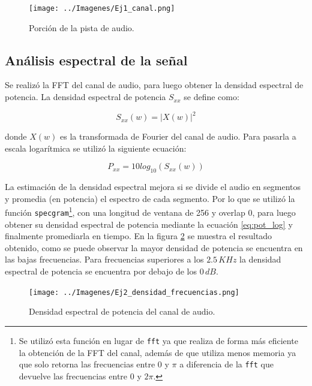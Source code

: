 \documentclass[10pt,spanish,a4paper,openany,notitlepage]{article}
\begin{document}
\begin{figure}[H] %
\begin{center}
\texttt{[image: ../Imagenes/Ej1\_canal.png]}
\caption{Porción de la pista de audio.}
 \label{fig:Ej1_audio}
\end{center}
\end{figure}

\subsection{Análisis espectral de la señal}

Se realizó la FFT del canal de audio, para luego obtener la densidad
espectral de potencia. La densidad espectral de potencia $S_{xx}$
se define como:

\begin{equation}
S_{xx}(w) = |X(w)|^2
\end{equation}

donde $X(w)$ es la transformada de Fourier del canal de audio.
Para pasarla a escala logarítmica se utilizó la siguiente ecuación:

\begin{equation}
P_{xx} = 10 log_{10}(S_{xx}(w))
\label{eq:pot_log}
\end{equation}

La estimación de la densidad espectral mejora si se divide el audio
en segmentos y promedia (en potencia) el espectro de cada segmento.
Por lo que se utilizó la función \texttt{specgram}\footnote{Se utilizó esta
función en lugar de \texttt{fft} ya que realiza de forma
más eficiente la obtención de la FFT del canal, además
de que utiliza menos memoria ya que solo retorna las frecuencias
entre 0 y $\pi$ a diferencia de la \texttt{fft} que devuelve
las frecuencias entre 0 y $2\pi$.
}, con una longitud de ventana de 256 y overlap 0, para luego obtener
su densidad espectral de potencia mediante la ecuación \ref{eq:pot_log} y finalmente
promediarla en tiempo. 
En la figura \ref{fig:Ej2_pot} se muestra el resultado obtenido, como
se puede observar la mayor densidad de potencia se encuentra en las bajas frecuencias.
Para frecuencias superiores a los $2.5\, \unit{KHz}$ la densidad
espectral de potencia se encuentra por debajo de los $0\, \unit{dB}$. 

\begin{figure}[H] %
\begin{center}
\texttt{[image: ../Imagenes/Ej2\_densidad\_frecuencias.png]}
\caption{Densidad espectral de potencia del canal de audio.}
 \label{fig:Ej2_pot}
\end{center}
\end{figure}
\end{document}
